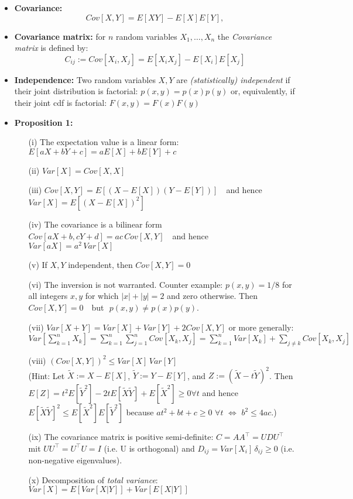 \documentclass[11pt]{article}
\begin{document}
\begin{itemize}
\item {\bf Covariance:} 
$$
Cov[X,Y]= E[XY]-E[X]E[Y], 
$$
\item {\bf Covariance matrix:} for  $n$ random variables $X_1, \dots , X_n$ the {\it Covariance matrix} is defined by:
$$
 C_{ij} := Cov[X_i, X_j] = E[X_i X_j] - E[X_i] E[X_j]
$$
\item {\bf Independence:} 
Two random variables $X,Y$ are {\it (statistically) independent} if their joint distribution is factorial: $p(x,y)= p(x) p(y)$ or, equivalently, if their joint cdf is factorial: $F(x,y)=F(x)F(y)$
\item {\bf Proposition 1:} 
\begin{itemize}
\item[(i)] The expectation value is a linear form: $E[aX +bY+c]= a E[X]+bE[Y]+c$
\item[(ii)] $Var[X] = Cov[X,X]$
\item[(iii)] $Cov[X, Y] = E[(X - E[X])(Y-E[Y])]$ \,\, and hence \,\, $Var[X] = E[(X - E[X])^2]$
\item[(iv)] The covariance is a bilinear form $Cov[aX+b, cY+d]=ac \, Cov[X, Y] $ \,\, and hence \,\, $Var[aX] = a^2\, Var[X]$
\item[(v)] If  $X,Y$ independent, then $Cov[X,Y] = 0$
\item[(vi)] The inversion is not warranted. Counter example: $p(x,y) = 1/8$ for all integers $x,y$ for which $|x| + |y| =2 $ and zero otherwise. Then\,\,  $Cov[X,Y] = 0$ \,\, but\,\, $p(x,y)\ne p(x) p(y)$.
\item[(vii)] $Var[X+Y] =  Var[X] + Var[Y] + 2 Cov[X,Y]$ or more generally:\\[.2cm] $Var\left[\sum_{k=1}^n X_k \right] = \sum_{k=1}^n \sum_{j=1}^n Cov[X_k, X_j] = \sum_{k=1}^n Var[X_k] + \sum_{j\ne k} Cov[X_k, X_j] $
\item[(viii)] $(Cov[X, Y])^2\le Var[X] \, Var[Y]$ \\(Hint: Let $\tilde X:=X-E[X]$, $\tilde Y:=Y-E[Y]$, and $Z:= (\tilde X-t\tilde Y)^2$. Then $E[Z]=t^2 E[\tilde Y^2]-2tE[\tilde X\tilde Y]+E[\tilde X^2] \ge 0 \forall t$ and hence $E[\tilde X\tilde Y]^2 \le E[\tilde X^2]E[\tilde Y^2]$ because $at^2 + bt+c \ge 0\,\, \forall t \,\, \Leftrightarrow \,\, b^2\le 4ac$.) 
\item[(ix)] The covariance matrix is positive semi-definite: $C=AA^\top=UDU^\top$ mit $UU^\top=U^\top U=I$ (i.e. U is orthogonal) and $D_{ij}=Var[X_i] \, \delta_{ij} \ge 0$ (i.e. non-negative eigenvalues).
\item[(x)] Decomposition of {\it total variance}: $Var[X] = E[Var[X|Y]] + Var[E[X|Y]]$

\end{itemize}
\end{itemize}
\end{document}
